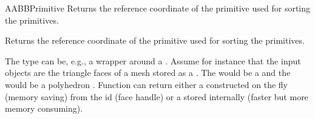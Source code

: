 \begin{ccRefConcept}{AABBPrimitive}
{Returns the  reference coordinate of the primitive used for sorting the primitives.}

{Returns the  reference coordinate of the primitive used for sorting the primitives.}

\ccSeeAlso
{}

\ccExample

The  type can be, e.g., a wrapper around a . Assume for instance that the input objects are the triangle faces of a mesh stored as a . The  would be a  and the  would be a polyhedron . Function  can return either a  constructed on the fly (memory saving) from the id (face handle) or a  stored internally (faster but more memory consuming). 

\end{ccRefConcept}

\ccRefPageEnd

